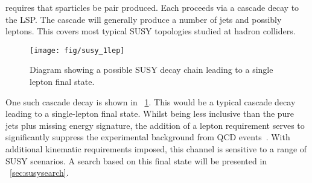 \Rparity requires that sparticles be pair produced. Each proceeds via a cascade
decay to the \ac{LSP}. The cascade will generally produce a number of jets and
possibly leptons. This covers most typical \ac{SUSY} topologies studied at
hadron colliders.

\begin{figure}[h!]
\centering
\texttt{[image: fig/susy\_1lep]}
\caption[\ac{SUSY} decay chain leading to a single lepton final state]{Diagram
  showing a possible \ac{SUSY} decay chain leading to a single lepton final
  state.}
\label{fig:susy_1lep_decay}
\end{figure}

One such cascade decay is shown in \fig~\ref{fig:susy_1lep_decay}. This would be
a typical cascade decay leading to a single-lepton final state. Whilst being
less inclusive than the pure jets plus missing energy signature, the addition of
a lepton requirement serves to significantly suppress the experimental
background from \ac{QCD} events~\cite{msugra_signals}. With additional kinematic
requirements imposed, this channel is sensitive to a range of \ac{SUSY}
scenarios. A search based on this final state will be presented in
\chap~\ref{sec:susysearch}.

